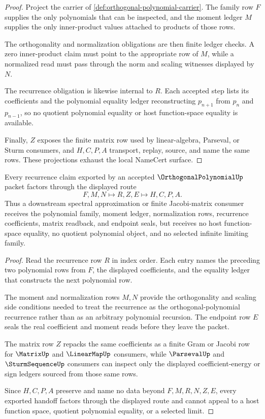 \begin{proof}
Project the carrier of \autoref{def:orthogonal-polynomial-carrier}. The family row $F$ supplies the only polynomials that can be inspected, and the moment ledger $M$ supplies the only inner-product values attached to products of those rows.

The orthogonality and normalization obligations are then finite ledger checks. A zero inner-product claim must point to the appropriate row of $M$, while a normalized read must pass through the norm and scaling witnesses displayed by $N$.

The recurrence obligation is likewise internal to $R$. Each accepted step lists its coefficients and the polynomial equality ledger reconstructing $p_{n+1}$ from $p_n$ and $p_{n-1}$, so no quotient polynomial equality or host function-space equality is available.

Finally, $Z$ exposes the finite matrix row used by linear-algebra, Parseval, or Sturm consumers, and $H,C,P,A$ transport, replay, source, and name the same rows. These projections exhaust the local NameCert surface.
\end{proof}

\begin{theorem}
\label{thm:orthogonal-polynomial-three-term-recurrence-handoff}
Every recurrence claim exported by an accepted $\OrthogonalPolynomialUp$ packet factors through the displayed route
$$
F,M,N \longmapsto R,Z,E \longmapsto H,C,P,A .
$$
Thus a downstream spectral approximation or finite Jacobi-matrix consumer receives the polynomial family, moment ledger, normalization rows, recurrence coefficients, matrix readback, and endpoint seals, but receives no host function-space equality, no quotient polynomial object, and no selected infinite limiting family.
\end{theorem}
\begin{proof}
Read the recurrence row $R$ in index order. Each entry names the preceding two polynomial rows from $F$, the displayed coefficients, and the equality ledger that constructs the next polynomial row.

The moment and normalization rows $M,N$ provide the orthogonality and scaling side conditions needed to treat the recurrence as the orthogonal-polynomial recurrence rather than as an arbitrary polynomial recursion. The endpoint row $E$ seals the real coefficient and moment reads before they leave the packet.

The matrix row $Z$ repacks the same coefficients as a finite Gram or Jacobi row for $\MatrixUp$ and $\LinearMapUp$ consumers, while $\ParsevalUp$ and $\SturmSequenceUp$ consumers can inspect only the displayed coefficient-energy or sign ledgers sourced from those same rows.

Since $H,C,P,A$ preserve and name no data beyond $F,M,R,N,Z,E$, every exported handoff factors through the displayed route and cannot appeal to a host function space, quotient polynomial equality, or a selected limit.
\end{proof}

